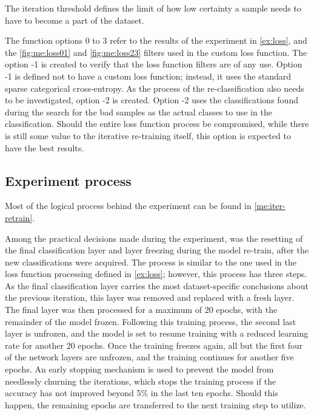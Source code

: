 The iteration threshold defines the limit of how low certainty a sample needs to have to become a part of the dataset.

The function options 0 to 3 refer to the results of the experiment in \cref{ex:loss}, and the \cref{fig:me:loss01} and \cref{fig:me:loss23} filters used in the custom loss function.
The option -1 is created to verify that the loss function filters are of any use.
Option -1 is defined not to have a custom loss function; instead, it uses the standard sparse categorical cross-entropy.
As the process of the re-classification also needs to be investigated, option -2 is created.
Option -2 uses the classifications found during the search for the bad samples as the actual classes to use in the classification.
Should the entire loss function process be compromised, while there is still some value to the iterative re-training itself, this option is expected to have the best results.

\subsection{Experiment process}
Most of the logical process behind the experiment can be found in \cref{me:iter-retrain}.

Among the practical decisions made during the experiment, was the resetting of the final classification layer and layer freezing during the model re-train, after the new classifications were acquired.
The process is similar to the one used in the loss function processing defined in \cref{ex:loss}; however, this process has three steps.
As the final classification layer carries the most dataset-specific conclusions about the previous iteration, this layer was removed and replaced with a fresh layer.
The final layer was then processed for a maximum of 20 epochs, with the remainder of the model frozen.
Following this training process, the second last layer is unfrozen, and the model is set to resume training with a reduced learning rate for another 20 epochs.
Once the training freezes again, all but the first four of the network layers are unfrozen, and the training continues for another five epochs.
An early stopping mechanism is used to prevent the model from needlessly churning the iterations, which stops the training process if the accuracy has not improved beyond 5\% in the last ten epochs.
Should this happen, the remaining epochs are transferred to the next training step to utilize.



